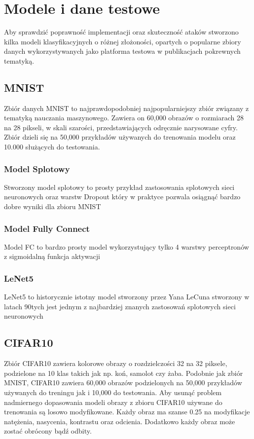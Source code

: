 \documentclass{article}
\begin{document}
\section{Modele i dane testowe}
Aby sprawdzić poprawność implementacji oraz skuteczność ataków stworzono
kilka modeli klasyfikacyjnych o różnej złożoności, opartych o popularne zbiory danych
wykorzystywanych jako platforma testowa w publikacjach pokrewnych tematyką.

    \subsection{MNIST}
    Zbiór danych MNIST  to najprawdopodobniej najpopularniejszy zbiór związany z
    tematyką nauczania maszynowego.
    Zawiera on 60,000 obrazów o rozmiarach 28 na 28 pikseli, w skali szarości, przedstawiających
    odręcznie narysowane cyfry. Zbiór dzieli się na 50,000 przykładów używanych do
    trenowania modelu oraz 10.000 służących do testowania.

        \subsubsection{Model Splotowy}
        Stworzony model splotowy to prosty przykład zastosowania splotowych sieci neuronowych oraz warstw Dropout
        który w praktyce pozwala osiągnąć bardzo dobre wyniki dla zbioru MNIST

        \subsubsection{Model Fully Connect}
        Model FC to bardzo prosty model wykorzystujący tylko 4 warstwy perceptronów z sigmoidalną funkcja aktywacji

        \subsubsection{LeNet5}
        LeNet5 to historycznie istotny model stworzony przez Yana LeCuna stworzony w latach 90tych
        jest jednym z najbardziej znanych zastosowań splotowych sieci neuronowych

    \subsection{CIFAR10}
    Zbiór CIFAR10  zawiera kolorowe obrazy o rozdzielczości 32 na 32 piksele,
    podzielone na 10 klas takich jak np. koń, samolot czy żaba. Podobnie jak zbiór MNIST, CIFAR10 zawiera
    60,000 obrazów podzielonych na 50,000 przykładów używanych do treningu jak i 10,000 do testowania.
    Aby usunąć problem nadmiernego dopasowania modeli obrazy z zbioru CIFAR10 używane
    do trenowania są losowo modyfikowane. Każdy obraz ma szanse 0.25  na
    modyfikacje natężenia, nasycenia, kontrastu oraz odcienia. Dodatkowo każdy obraz może zostać obrócony bądź odbity.
\end{document}
